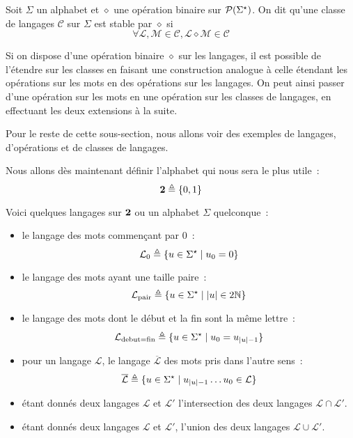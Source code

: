 \begin{definition}
  Soit $\Sigma$ un alphabet et $\diamond$ une opération binaire sur
  $\mathcal{P}(\Sigma^\star)$. On dit qu'une classe de langages $\mathcal C$ sur
  $\Sigma$ est stable par $\diamond$ si
  \[\forall \mathcal L,\mathcal M\in\mathcal C,
  \mathcal L\diamond \mathcal M\in\mathcal C\]
\end{definition}

\begin{remark}
  Si on dispose d'une opération binaire $\diamond$ sur les langages, il est
  possible de l'étendre sur les classes en faisant une construction analogue
  à celle étendant les opérations sur les mots en des opérations sur les
  langages. On peut ainsi passer d'une opération sur les mots en une opération
  sur les classes de langages, en effectuant les deux extensions à la suite.
\end{remark}

Pour le reste de cette sous-section, nous allons voir des exemples de langages,
d'opérations et de classes de langages.

\begin{example}
  Nous allons dès maintenant définir l'alphabet qui nous sera le plus utile~:
  \[\boldsymbol{2} \triangleq \{0,1\}\]

  Voici quelques langages sur $\boldsymbol{2}$ ou un alphabet $\Sigma$ quelconque~:
  \begin{itemize}
  \item le langage des mots commençant par $0$~:
    \[\mathcal L_0 \triangleq \{u\in\Sigma^\star\mid u_0 = 0\}\]
  \item le langage des mots ayant une taille paire~:
    \[\mathcal L_{\mathrm{pair}} \triangleq \{u\in\Sigma^\star
    \mid |u|\in2\mathbb N\}\]
  \item le langage des mots dont le début et la fin sont la même lettre~:
    \[\mathcal L_{\mathrm{debut}=\mathrm{fin}}\triangleq
    \{u\in\Sigma^\star\mid u_0 = u_{|u| - 1}\}\]
  \item pour un langage $\mathcal L$, le langage $\overline{\mathcal L}$ des
    mots pris dans l'autre sens~:
    \[\overline{\mathcal L}\triangleq
    \{u\in\Sigma^\star\mid u_{|u|-1}\ldots u_0 \in \mathcal L\}\]
  \item étant donnés deux langages $\mathcal L$ et $\mathcal L'$ l'intersection
    des deux langages $\mathcal L \cap \mathcal L'$.
  \item étant donnés deux langages $\mathcal L$ et $\mathcal L'$, l'union des
    deux langages $\mathcal L\cup\mathcal L'$.
  \end{itemize}
\end{example}

